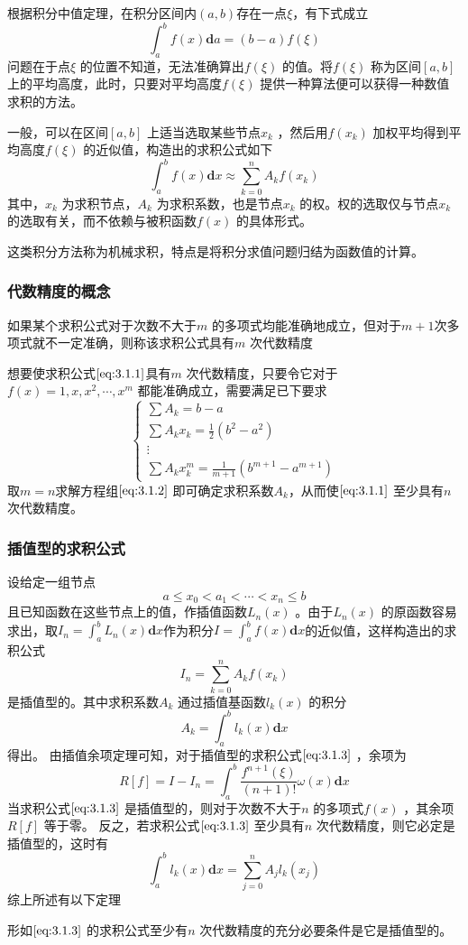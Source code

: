 \documentclass[a4paper]{article}
\begin{document}
根据积分中值定理，在积分区间内$(a,b)$存在一点$\xi$，有下式成立
\[
	\int_{a}^{b} f(x) \mathbf{d} a = (b - a) f(\xi) 
\] 
问题在于点$\xi$ 的位置不知道，无法准确算出$f(\xi)$ 的值。将$f(\xi)$ 称为区间$[a,b]$ 上的平均高度，此时，只要对平均高度$f(\xi)$ 提供一种算法便可以获得一种数值求积的方法。

一般，可以在区间$[a,b]$ 上适当选取某些节点$x_{k}$ ，然后用$f(x_{k})$ 加权平均得到平均高度$f(\xi)$ 的近似值，构造出的求积公式如下
\[
	\int_{a}^{b} f(x) \mathbf{d} x \approx \sum_{k=0}^{n} A_k f(x_{k}) \tag{3.1.1}\label{eq:3.1.1} 
\]
其中，$x_{k}$ 为求积节点，$A_k$ 为求积系数，也是节点$x_{k}$ 的权。权的选取仅与节点$x_{k}$ 的选取有关，而不依赖与被积函数$f(x)$ 的具体形式。

这类积分方法称为机械求积，特点是将积分求值问题归结为函数值的计算。

\subsubsection{代数精度的概念}

\begin{definition}
	如果某个求积公式对于次数不大于$m$ 的多项式均能准确地成立，但对于$m+1$次多项式就不一定准确，则称该求积公式具有$m$ 次代数精度
\end{definition}
想要使求积公式$\ref{eq:3.1.1}$具有$m$ 次代数精度，只要令它对于$f(x) = 1,x, x^2, \cdots, x^{m}$ 都能准确成立，需要满足已下要求
\[
\begin{cases}
	\sum A_k = b - a \\
	\sum A_k x_{k} = \frac{1}{2} (b^2 - a^2) \\
	\vdots \\
	\sum A_k x_k^{m} = \frac{1}{m+1}(b^{m+1} - a^{m+1})
\end{cases} \tag{3.1.2} \label{eq:3.1.2}
\] 
取$m=n$求解方程组$\ref{eq:3.1.2}$ 即可确定求积系数$A_k$，从而使$\ref{eq:3.1.1}$ 至少具有$n$ 次代数精度。

\subsubsection{插值型的求积公式}
设给定一组节点
\[
a \le x_0 < a_1 < \cdots < x_{n} \le b
\] 
且已知函数在这些节点上的值，作插值函数$L_n(x)$ 。由于$L_n(x)$ 的原函数容易求出，取$I_n = \int_{a}^{b} L_n(x) \mathbf{d} x $作为积分$I = \int_{a}^{b} f(x) \mathbf{d} x $的近似值，这样构造出的求积公式
\[
	I_n = \sum_{k=0}^{n} A_k f(x_{k}) \tag{3.1.3} \label{eq:3.1.3}
\] 
是插值型的。其中求积系数$A_k$ 通过插值基函数$l_k(x)$ 的积分
\[
	A_k = \int_{a}^{b} l_k(x) \mathbf{d} x \tag{3.1.4} \label{eq:3.1.4}
\] 
得出。
由插值余项定理可知，对于插值型的求积公式$\ref{eq:3.1.3}$ ，余项为
\[
	R[f] = I - I_n = \int_{a}^{b} \frac{f^{n+1}(\xi)}{(n+1)!}\omega(x) \mathbf{d} x \tag{3.1.5} \label{eq:3.1.5}
\] 
当求积公式$\ref{eq:3.1.3}$ 是插值型的，则对于次数不大于$n$ 的多项式$f(x)$ ，其余项$R[f]$ 等于零。
反之，若求积公式$\ref{eq:3.1.3}$ 至少具有$n$ 次代数精度，则它必定是插值型的，这时有
\[
\int_{a}^{b} l_k(x) \mathbf{d} x = \sum_{j=0}^{n} A_j l_k(x_{j})
\] 
综上所述有以下定理
\begin{theorem}
	形如$\ref{eq:3.1.3}$ 的求积公式至少有$n$ 次代数精度的充分必要条件是它是插值型的。
\end{theorem}
\end{document}
